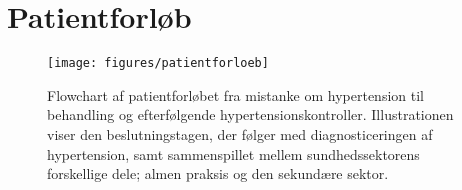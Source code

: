 \chapter{Patientforløb}

\begin{figure}[H]
\centering
\texttt{[image: figures/patientforloeb]}
\caption{Flowchart af patientforløbet fra mistanke om hypertension til behandling og efterfølgende hypertensionskontroller. Illustrationen viser den beslutningstagen, der følger med diagnosticeringen af hypertension, samt sammenspillet mellem sundhedssektorens forskellige dele; almen praksis og den sekundære sektor.}
\label{fig:patientforloeb}
\end{figure}